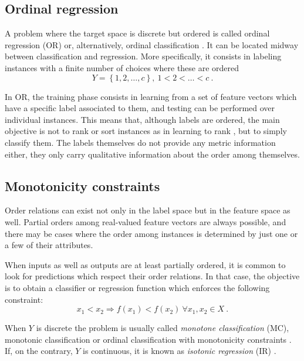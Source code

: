 \subsection{Ordinal regression}

A problem where the target space is discrete but ordered is called ordinal regression (OR) or, alternatively, ordinal classification . It can be located midway between classification and regression. More specifically, it consists in labeling instances with a finite number of choices where these are ordered
\begin{equation}
Y=\left\{1,2,\dots,c\right\},~1<2<\dots<c~.
\end{equation}

In OR, the training phase consists in learning from a set of feature vectors which have a specific label associated to them, and testing can be performed over individual instances. This means that, although labels are ordered, the main objective is not to rank or sort instances as in learning to rank , but to simply classify them. The labels themselves do not provide any metric information either, they only carry qualitative information about the order among themselves.

\subsection{Monotonicity constraints}

Order relations can exist not only in the label space but in the feature space as well. Partial orders among real-valued feature vectors are always possible, and there may be cases where the order among instances is determined by just one or a few of their attributes.

When inputs as well as outputs are at least partially ordered, it is common to look for predictions which respect their order relations. In that case, the objective is to obtain a classifier or regression function which enforces the following constraint:
\begin{equation}
x_1<x_2\Rightarrow f(x_1)<f(x_2)~\forall x_1,x_2\in X~.
\end{equation}

When $Y$ is discrete the problem is usually called \emph{monotone classification} (MC), monotonic classification or ordinal classification with monotonicity constraints . If, on the contrary, $Y$ is continuous, it is known as \emph{isotonic regression} (IR) .

